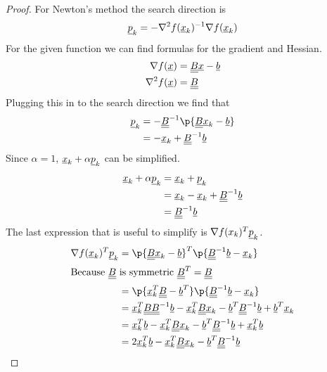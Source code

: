 \documentclass[11pt, oneside]{article}
\begin{document}
\begin{enumerate}
    \begin{proof}
      For Newton's method the search direction is
      \[
        \underline{p}_k = -\nabla^2 f(\underline{x}_k)^{-1} \nabla f(\underline{x}_k)
      \]
      For the given function we can find formulas for the gradient and Hessian.
      \begin{align*}
        \nabla f(\underline{x}) &= \underline{\underline{B}} \underline{x} - \underline{b} \\
        \nabla^2 f(\underline{x}) &= \underline{\underline{B}} \\
      \end{align*}
      Plugging this in to the search direction we find that
      \begin{align*}
        \v{p}_k &= - \M{B}^{-1} \p{\M{B} \v{x}_k - \v{b}} \\
        &= -\v{x}_k + \M{B}^{-1} \v{b}
      \end{align*}
      Since $\alpha = 1$, $\underline{x}_k + \alpha \underline{p}_k$ can be simplified.
      \begin{align*}
        \underline{x}_k + \alpha \underline{p}_k &= \underline{x}_k + \underline{p}_k \\
        &= \underline{x}_k - \underline{x}_k + \underline{\underline{B}}^{-1} \underline{b} \\
        &= \underline{\underline{B}}^{-1} \underline{b}
      \end{align*}
      The last expression that is useful to simplify is $\nabla f(x_k)^T \underline{p}_k$.
      \begin{align*}
        \nabla f(\v{x}_k)^T \v{p}_k &= \p{\M{B} \v{x}_k - \v{b}}^T \p{\M{B}^{-1} \v{b} - \v{x}_k} \\
        \intertext{Because $\M{B}$ is symmetric $\M{B}^T = \M{B}$}
        &= \p{\v{x}_k^T \M{B} - \v{b}^T} \p{\M{B}^{-1} \v{b} - \v{x}_k} \\
        &= \v{x}_k^T \M{B} \M{B}^{-1} \v{b} - \v{x}_k^T \M{B} \v{x}_k - \v{b}^T \M{B}^{-1} \v{b} + \v{b}^T\v{x}_k \\
        &= \v{x}_k^T \v{b} - \v{x}_k^T \M{B} \v{x}_k - \v{b}^T \M{B}^{-1} \v{b} + \v{x}_k^T \v{b} \\
        &= 2\v{x}_k^T \v{b} - \v{x}_k^T \M{B} \v{x}_k - \v{b}^T \M{B}^{-1} \v{b} \\
      \end{align*}


\end{proof}
\end{enumerate}
\end{document}
